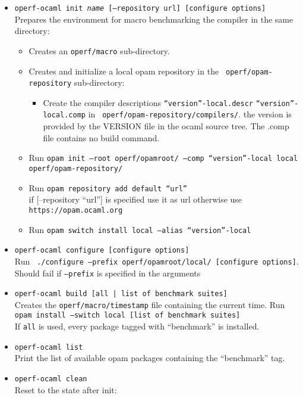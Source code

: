 \documentclass[11pt,a4paper]{article}
\begin{document}
\begin{itemize}
\item {\tt operf-ocaml init {\em name} [--repository url] [configure options]}\\
  Prepares the environment for macro benchmarking the
  compiler in the same directory:
  \begin{itemize}
  \item Creates an {\tt operf/macro} sub-directory.
  \item Creates and initialize a local opam repository in the {\tt
    operf/opam-repository} sub-directory:
    \begin{itemize}
    \item Create the compiler descriptions {\tt ``version''-local.descr}
      {\tt ``version''-local.comp} in {\tt
        operf/opam-repository/compilers/}.  the version is provided by
      the VERSION file in the ocaml source tree. The .comp file
      contains no build command.
    \end{itemize}
  \item Run {\tt opam init --root operf/opamroot/ --comp
    ``version''-local local operf/opam-repository/}
  \item Run {\tt opam repository add default ``url''}\\ if
    [--repository ``url''] is specified use it as url otherwise use
    {\tt https://opam.ocaml.org}
  \item Run {\tt opam switch install local --alias ``version''-local}
  \end{itemize}
\item {\tt operf-ocaml configure [configure options]}\\ Run {\tt
  ./configure --prefix operf/opamroot/local/ [configure
    options]}. Should fail if {\tt --prefix} is specified in the
  arguments
\item {\tt operf-ocaml build [all | list of benchmark suites]}\\
  Creates the {\tt operf/macro/timestamp} file containing the
  current time.
  Run {\tt opam install --switch local [list of benchmark
      suites]}\\ If {\tt all} is used, every package tagged with
  ``benchmark'' is installed.
\item {\tt operf-ocaml list}\\ Print the list of available opam
  packages containing the ``benchmark'' tag.
\item {\tt operf-ocaml clean}\\ Reset to the state after init:\\

\end{itemize}
\end{document}
